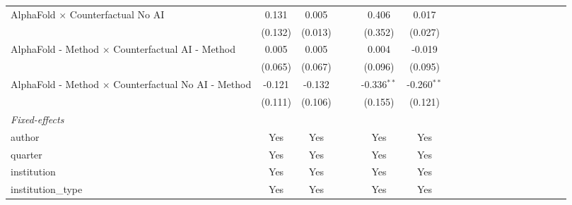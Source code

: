 \begin{tabular}{lcccccccccccccccccc}
   AlphaFold $\times$ Counterfactual No AI                    & 0.131       & 0.005   &     &     & 0.406         & 0.017         &     &     &     &      &      &      &      &      &      &      &      &   \\   
                                                              & (0.132)     & (0.013) &     &     & (0.352)       & (0.027)       &     &     &     &      &      &      &      &      &      &      &      &   \\   
   AlphaFold - Method $\times$ Counterfactual AI - Method     & 0.005       & 0.005   &     &     & 0.004         & -0.019        &     &     &     &      &      &      &      &      &      &      &      &   \\   
                                                              & (0.065)     & (0.067) &     &     & (0.096)       & (0.095)       &     &     &     &      &      &      &      &      &      &      &      &   \\   
   AlphaFold - Method $\times$ Counterfactual No AI - Method  & -0.121      & -0.132  &     &     & -0.336$^{**}$ & -0.260$^{**}$ &     &     &     &      &      &      &      &      &      &      &      &   \\   
                                                              & (0.111)     & (0.106) &     &     & (0.155)       & (0.121)       &     &     &     &      &      &      &      &      &      &      &      &   \\   
   \midrule
   \emph{Fixed-effects}\\
   author                                                     & Yes         & Yes     &     &     & Yes           & Yes           &     &     &     &      &      &      &      &      &      &      &      & \\  
   quarter                                                    & Yes         & Yes     &     &     & Yes           & Yes           &     &     &     &      &      &      &      &      &      &      &      & \\  
   institution                                                & Yes         & Yes     &     &     & Yes           & Yes           &     &     &     &      &      &      &      &      &      &      &      & \\  
   institution\_type                                          & Yes         & Yes     &     &     & Yes           & Yes           &     &     &     &      &      &      &      &      &      &      &      & \\  

\end{tabular}
